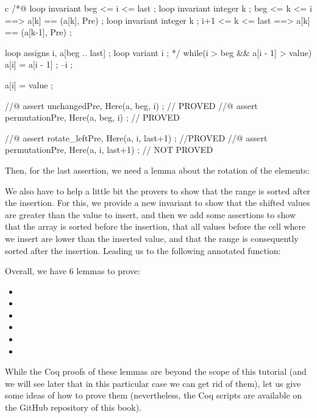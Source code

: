 \begin{CodeBlock}{c}
  /*@
    loop invariant beg <= i <= last ;
    loop invariant \forall integer k ; beg <= k <= i    ==> a[k] == \at(a[k], Pre) ;
    loop invariant \forall integer k ; i+1 <= k <= last ==> a[k] == \at(a[k-1], Pre) ;

    loop assigns i, a[beg .. last] ;
    loop variant i ;
  */
  while(i > beg && a[i - 1] > value){
    a[i] = a[i - 1] ;
    --i ;
  }

  a[i] = value ;

  //@ assert unchanged{Pre, Here}(a, beg, i) ;   // PROVED
  //@ assert permutation{Pre, Here}(a, beg, i) ; // PROVED

  //@ assert rotate_left{Pre, Here}(a, i, last+1) ; //PROVED
  //@ assert permutation{Pre, Here}(a, i, last+1) ; // NOT PROVED
\end{CodeBlock}


Then, for the last assertion, we need a lemma about the rotation of the
elements:



We also have to help a little bit the provers to show that the range is
sorted after the insertion. For this, we provide a new invariant to show
that the shifted values are greater than the value to insert, and then
we add some assertions to show that the array is sorted before the
insertion, that all values before the cell where we insert are lower than
the inserted value, and that the range is consequently sorted after the
insertion. Leading us to the following annotated 
function:





Overall, we have 6 lemmas to prove:
\begin{itemize}
\item {}
\item {}
\item {}
\item {}
\item {}
\item {}
\end{itemize}

While the Coq proofs of these lemmas are beyond the scope of this tutorial (and
we will see later that in this particular case we can get rid of them), let
us give some ideas of how to prove them (nevertheless, the Coq scripts are
available on the GitHub repository of this book).


